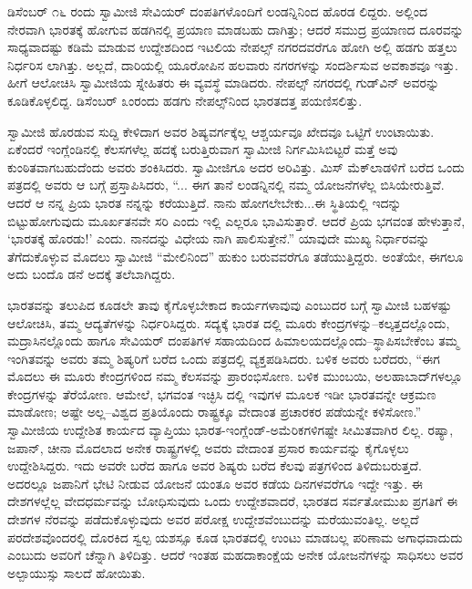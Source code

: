 ಡಿಸೆಂಬರ್ ೧೬ ರಂದು ಸ್ವಾಮೀಜಿ ಸೇವಿಯರ್ ದಂಪತಿಗಳೊಂದಿಗೆ ಲಂಡನ್ನಿನಿಂದ ಹೊರಡ ಲಿದ್ದರು. ಅಲ್ಲಿಂದ ನೇರವಾಗಿ ಭಾರತಕ್ಕೆ ಹೋಗುವ ಹಡಗಿನಲ್ಲಿ ಪ್ರಯಾಣ ಮಾಡಬಹು ದಾಗಿತ್ತು; ಆದರೆ ಸಮುದ್ರ ಪ್ರಯಾಣದ ದೂರವನ್ನು ಸಾಧ್ಯವಾದಷ್ಟು ಕಡಿಮೆ ಮಾಡುವ ಉದ್ದೇಶದಿಂದ ಇಟಲಿಯ ನೇಪಲ್ಸ್ ನಗರದವರೆಗೂ ಹೋಗಿ ಅಲ್ಲಿ ಹಡಗು ಹತ್ತಲು ನಿರ್ಧರಿಸ ಲಾಗಿತ್ತು. ಅಲ್ಲದೆ, ದಾರಿಯಲ್ಲಿ ಯೂರೋಪಿನ ಹಲವಾರು ನಗರಗಳನ್ನು ಸಂದರ್ಶಿಸುವ ಅವಕಾಶವೂ ಇತ್ತು. ಹೀಗೆ ಆಲೋಚಿಸಿ ಸ್ವಾಮೀಜಿಯ ಸ್ನೇಹಿತರು ಈ ವ್ಯವಸ್ಥೆ ಮಾಡಿದರು. ನೇಪಲ್ಸ್ ನಗರದಲ್ಲಿ ಗುಡ್​ವಿನ್ ಅವರನ್ನು ಕೂಡಿಕೊಳ್ಳಲಿದ್ದ. ಡಿಸೆಂಬರ್ ೩ಂರಂದು ಹಡಗು ನೇಪಲ್ಸ್​ನಿಂದ ಭಾರತದತ್ತ ಪಯಣಿಸಲಿತ್ತು.

ಸ್ವಾಮೀಜಿ ಹೊರಡುವ ಸುದ್ದಿ ಕೇಳಿದಾಗ ಅವರ ಶಿಷ್ಯವರ್ಗಕ್ಕೆಲ್ಲ ಆಶ್ಚರ್ಯವೂ ಖೇದವೂ ಒಟ್ಟಿಗೆ ಉಂಟಾಯಿತು. ಏಕೆಂದರೆ ಇಂಗ್ಲೆಂಡಿನಲ್ಲಿ ಕೆಲಸಗಳೆಲ್ಲ ಹದಕ್ಕೆ ಬರುತ್ತಿರುವಾಗ ಸ್ವಾಮೀಜಿ ನಿರ್ಗಮಿಸಿಬಿಟ್ಟರೆ ಮತ್ತೆ ಅವು ಕುಂಠಿತವಾಗಬಹುದೆಂದು ಅವರು ಶಂಕಿಸಿದರು. ಸ್ವಾಮೀಜಿಗೂ ಅದರ ಅರಿವಿತ್ತು. ಮಿಸ್ ಮೆಕ್​ಲಾಡಳಿಗೆ ಬರೆದ ಒಂದು ಪತ್ರದಲ್ಲಿ ಅವರು ಆ ಬಗ್ಗೆ ಪ್ರಸ್ತಾಪಿಸಿದರು, “... ಈಗ ತಾನೆ ಲಂಡನ್ನಿನಲ್ಲಿ ನಮ್ಮ ಯೋಜನೆಗಳೆಲ್ಲ ಬಿಸಿಯೇರುತ್ತಿವೆ. ಆದರೆ ಆ ನನ್ನ ಪ್ರಿಯ ಭಾರತ ನನ್ನನ್ನು ಕರೆಯುತ್ತಿದೆ. ನಾನು ಹೋಗಲೇಬೇಕು...ಈ ಸ್ಥಿತಿಯಲ್ಲಿ ಇದನ್ನು ಬಿಟ್ಟುಹೋಗುವುದು ಮೂರ್ಖತನವೇ ಸರಿ ಎಂದು ಇಲ್ಲಿ ಎಲ್ಲರೂ ಭಾವಿಸುತ್ತಾರೆ. ಆದರೆ ಪ್ರಿಯ ಭಗವಂತ ಹೇಳುತ್ತಾನೆ, ‘ಭಾರತಕ್ಕೆ ಹೊರಡು!’ ಎಂದು. ನಾನದನ್ನು ವಿಧೇಯ ನಾಗಿ ಪಾಲಿಸುತ್ತೇನೆ.” ಯಾವುದೇ ಮುಖ್ಯ ನಿರ್ಧಾರವನ್ನು ತೆಗೆದುಕೊಳ್ಳುವ ಮೊದಲು ಸ್ವಾಮೀಜಿ “ಮೇಲಿನಿಂದ” ಹುಕುಂ ಬರುವವರೆಗೂ ತಡೆಯುತ್ತಿದ್ದರು. ಅಂತೆಯೇ, ಈಗಲೂ ಅದು ಬಂದೊ ಡನೆ ಅದಕ್ಕೆ ತಲೆಬಾಗಿದ್ದರು.

ಭಾರತವನ್ನು ತಲುಪಿದ ಕೂಡಲೇ ತಾವು ಕೈಗೊಳ್ಳಬೇಕಾದ ಕಾರ್ಯಗಳಾವುವು ಎಂಬುದರ ಬಗ್ಗೆ ಸ್ವಾಮೀಜಿ ಬಹಳಷ್ಟು ಆಲೋಚಿಸಿ, ತಮ್ಮ ಆದ್ಯತೆಗಳನ್ನು ನಿರ್ಧರಿಸಿದ್ದರು. ಸದ್ಯಕ್ಕೆ ಭಾರತ ದಲ್ಲಿ ಮೂರು ಕೇಂದ್ರಗಳನ್ನು–ಕಲ್ಕತ್ತದಲ್ಲೊಂದು, ಮದ್ರಾಸಿನಲ್ಲೊಂದು ಹಾಗೂ ಸೇವಿಯರ್ ದಂಪತಿಗಳ ಸಹಾಯದಿಂದ ಹಿಮಾಲಯದಲ್ಲೊಂದು–ಸ್ಥಾಪಿಸಬೇಕೆಂಬ ತಮ್ಮ ಇಂಗಿತವನ್ನು ಅವರು ತಮ್ಮ ಶಿಷ್ಯರಿಗೆ ಬರೆದ ಒಂದು ಪತ್ರದಲ್ಲಿ ವ್ಯಕ್ತಪಡಿಸಿದರು. ಬಳಿಕ ಅವರು ಬರೆದರು, “ಈಗ ಮೊದಲು ಈ ಮೂರು ಕೇಂದ್ರಗಳಿಂದ ನಮ್ಮ ಕೆಲಸವನ್ನು ಪ್ರಾರಂಭಿಸೋಣ. ಬಳಿಕ ಮುಂಬಯಿ, ಅಲಹಾಬಾದ್​ಗಳಲ್ಲೂ ಕೇಂದ್ರಗಳನ್ನು ತೆರೆಯೋಣ. ಆಮೇಲೆ, ಭಗವಂತ ಇಚ್ಛಿಸಿ ದಲ್ಲಿ ಇವುಗಳ ಮೂಲಕ ಇಡೀ ಭಾರತವನ್ನೇ ಆಕ್ರಮಣ ಮಾಡೋಣ; ಅಷ್ಟೇ ಅಲ್ಲ–ವಿಶ್ವದ ಪ್ರತಿಯೊಂದು ರಾಷ್ಟ್ರಕ್ಕೂ ವೇದಾಂತ ಪ್ರಚಾರಕರ ಪಡೆಯನ್ನೇ ಕಳಿಸೋಣ.” ಸ್ವಾಮೀಜಿಯ ಉದ್ದೇಶಿತ ಕಾರ್ಯದ ವ್ಯಾಪ್ತಿಯು ಭಾರತ-ಇಂಗ್ಲೆಂಡ್​-ಅಮೆರಿಕಗಳಿಗಷ್ಟೇ ಸೀಮಿತವಾಗಿರ ಲಿಲ್ಲ. ರಷ್ಯಾ, ಜಪಾನ್, ಚೀನಾ ಮೊದಲಾದ ಅನೇಕ ರಾಷ್ಟ್ರಗಳಲ್ಲಿ ಅವರು ವೇದಾಂತ ಪ್ರಸಾರ ಕಾರ್ಯವನ್ನು ಕೈಗೊಳ್ಳಲು ಉದ್ದೇಶಿಸಿದ್ದರು. ಇದು ಅವರೇ ಬರೆದ ಹಾಗೂ ಅವರ ಶಿಷ್ಯರು ಬರೆದ ಕೆಲವು ಪತ್ರಗಳಿಂದ ತಿಳಿದುಬರುತ್ತದೆ. ಅದರಲ್ಲೂ ಜಪಾನಿಗೆ ಭೇಟಿ ನೀಡುವ ಯೋಜನೆ ಯಂತೂ ಅವರ ಕಡೆಯ ದಿನಗಳವರೆಗೂ ಇದ್ದೇ ಇತ್ತು. ಈ ದೇಶಗಳಲ್ಲೆಲ್ಲ ವೇದಧರ್ಮವನ್ನು ಬೋಧಿಸುವುದು ಒಂದು ಉದ್ದೇಶವಾದರೆ, ಭಾರತದ ಸರ್ವತೋಮುಖ ಪ್ರಗತಿಗೆ ಈ ದೇಶಗಳ ನೆರವನ್ನು ಪಡೆದುಕೊಳ್ಳುವುದು ಅವರ ಪರೋಕ್ಷ ಉದ್ದೇಶವೆಂಬುದನ್ನು ಮರೆಯುವಂತಿಲ್ಲ. ಅಲ್ಲದೆ ಪರದೇಶವೊಂದರಲ್ಲಿ ದೊರಕಿದ ಸ್ವಲ್ಪ ಯಶಸ್ಸೂ ಕೂಡ ಭಾರತದಲ್ಲಿ ಉಂಟು ಮಾಡಬಲ್ಲ ಪರಿಣಾಮ ಅಗಾಧವಾದುದು ಎಂಬುದು ಅವರಿಗೆ ಚೆನ್ನಾಗಿ ತಿಳಿದಿತ್ತು. ಆದರೆ ಇಂತಹ ಮಹದಾಕಾಂಕ್ಷೆಯ ಅನೇಕ ಯೋಜನೆಗಳನ್ನು ಸಾಧಿಸಲು ಅವರ ಅಲ್ಪಾಯುಸ್ಸು ಸಾಲದೆ ಹೋಯಿತು.

